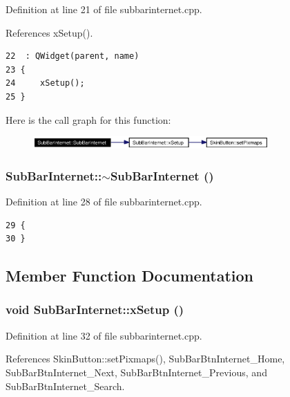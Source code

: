 Definition at line 21 of file subbarinternet.cpp.

References x\-Setup().



\footnotesize\begin{verbatim}22  : QWidget(parent, name)
23 {
24     xSetup();
25 }
\end{verbatim}\normalsize 


Here is the call graph for this function:\begin{figure}[H]
\begin{center}
\leavevmode
\includegraphics[width=256pt]{classSubBarInternet_SubBarInterneta0_cgraph}
\end{center}
\end{figure}
\subsubsection{\setlength{\rightskip}{0pt plus 5cm}Sub\-Bar\-Internet::$\sim${\bf Sub\-Bar\-Internet} ()}\label{classSubBarInternet_SubBarInterneta1}




Definition at line 28 of file subbarinternet.cpp.



\footnotesize\begin{verbatim}29 {
30 }
\end{verbatim}\normalsize 


\subsection{Member Function Documentation}
\subsubsection{\setlength{\rightskip}{0pt plus 5cm}void Sub\-Bar\-Internet::x\-Setup ()}\label{classSubBarInternet_SubBarInterneta2}




Definition at line 32 of file subbarinternet.cpp.

References Skin\-Button::set\-Pixmaps(), Sub\-Bar\-Btn\-Internet\_\-Home, Sub\-Bar\-Btn\-Internet\_\-Next, Sub\-Bar\-Btn\-Internet\_\-Previous, and Sub\-Bar\-Btn\-Internet\_\-Search.

